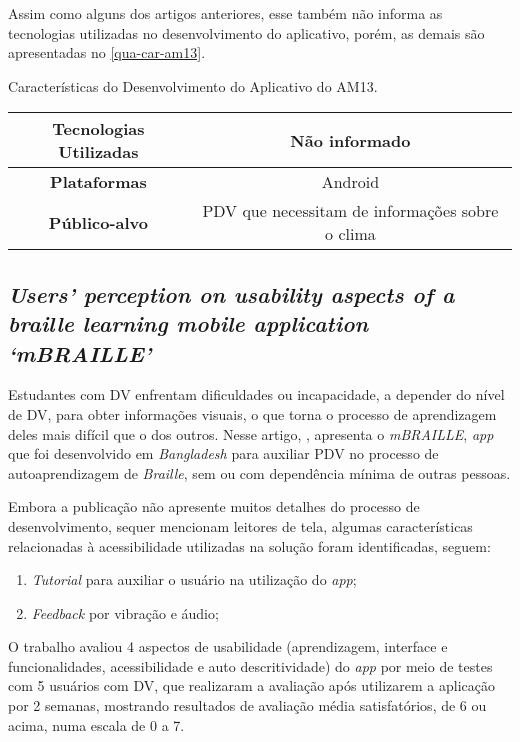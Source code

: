 Assim como alguns dos artigos anteriores, esse também não informa as tecnologias utilizadas no desenvolvimento do aplicativo, 
porém, as demais são apresentadas no \autoref{qua-car-am13}.

\begin{quadro}[htb!]
  \caption{\label{qua-car-am13}Características do Desenvolvimento do Aplicativo do AM13.}
  \begin{tabular}{|c|c|}
    \hline
    \textbf{Tecnologias Utilizadas} & Não informado                                   \\ \hline
    \textbf{Plataformas}            & Android                                         \\ \hline
    \textbf{Público-alvo}           & PDV que necessitam de informações sobre o clima \\
    \hline
  \end{tabular}
\end{quadro}

\subsection{\emph{Users’ perception on usability aspects of a braille learning mobile application ‘mBRAILLE’}}

Estudantes com DV enfrentam dificuldades ou incapacidade, a depender do nível de DV, para obter informações visuais, o que torna
o processo de aprendizagem deles mais difícil que o dos outros. Nesse artigo, , apresenta o \emph{mBRAILLE},
\emph{app} que foi desenvolvido em \emph{Bangladesh} para auxiliar PDV no processo de autoaprendizagem de \emph{Braille}, sem ou com
dependência mínima de outras pessoas.

Embora a publicação não apresente muitos detalhes do processo de desenvolvimento, sequer
mencionam leitores de tela, algumas características relacionadas à acessibilidade utilizadas na solução foram identificadas, seguem:

\begin{enumerate}
  \item \emph{Tutorial} para auxiliar o usuário na utilização do \emph{app};
  \item \emph{Feedback} por vibração e áudio;
\end{enumerate}

O trabalho avaliou 4 aspectos de usabilidade (aprendizagem, interface e funcionalidades, acessibilidade e auto descritividade)
do \emph{app} por meio de testes com 5 usuários com DV, que realizaram a avaliação após utilizarem a aplicação por 2 semanas,
mostrando resultados de avaliação média satisfatórios, de 6 ou acima, numa escala de 0 a 7.

